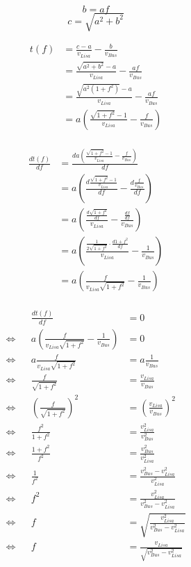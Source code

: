 \documentclass[10pt]{article}
\begin{document}
\newcommand{\comment}[1]{}

\newcommand{\vb}{v_{Bus}}
\newcommand{\vl}{v_{Lisa}}

\newcommand{\x}{x}

\renewcommand{\a}{a}
\renewcommand{\b}{b}
\renewcommand{\c}{c}

\newcommand{\f}{f}

\newcommand{\tf}{t(\f)}
\newcommand{\df}[1]{\frac{d#1}{d\f}}
\newcommand{\dtf}{\df{\tf}}

\newcommand{\abs}[1]{\lvert #1 \rvert}

\newpage

\[\b=\a\f\]
\[\c=\sqrt{\a^2+\b^2}\]

\begin{align*}
\tf &= \frac{\c-\a}{\vl} - \frac{\b}{\vb}\\
&= \frac{\sqrt{\a^2+\b^2}-\a}{\vl} - \frac{\a\f}{\vb}\\
&= \frac{\sqrt{\a^2(1+\f^2)}-\a}{\vl} - \frac{\a\f}{\vb}\\
&= \a\left(\frac{\sqrt{1+\f^2}-1}{\vl} - \frac{\f}{\vb}\right)\\
\end{align*}

\begin{align*}
\dtf &= \df{\a\left(\frac{\sqrt{1+\f^2}-1}{\vl} - \frac{\f}{\vb}\right)}\\
&= \a\left(\df{\frac{\sqrt{1+\f^2}-1}{\vl}} - \df{\frac{\f}{\vb}}\right)\\
&= \a\left(\frac{\df{\sqrt{1+\f^2}}}{\vl} - \frac{\df{\f}}{\vb}\right)\\
&= \a\left(\frac{\frac{1}{2\sqrt{1+\f^2}}\cdot\df{1+\f^2}}{\vl} - \frac{1}{\vb}\right)\\
&= \a\left(\frac{f}{\vl\sqrt{1+\f^2}} - \frac{1}{\vb}\right)\\
\end{align*}

\begin{align*}
&&\dtf &= 0\\
\iff&&\a\left(\frac{f}{\vl\sqrt{1+\f^2}} - \frac{1}{\vb}\right) &= 0\\
\iff&&\a\frac{f}{\vl\sqrt{1+\f^2}} &= \a\frac{1}{\vb}\\
\iff&&\frac{f}{\sqrt{1+\f^2}} &= \frac{\vl}{\vb}\\
\iff&&\left(\frac{f}{\sqrt{1+\f^2}}\right)^2 &= \left(\frac{\vl}{\vb}\right)^2\\
\iff&&\frac{f^2}{1+\f^2} &= \frac{\vl^2}{\vb^2}\\
\iff&&\frac{1+\f^2}{f^2} &= \frac{\vb^2}{\vl^2}\\
\iff&&\frac{1}{f^2} &= \frac{\vb^2-\vl^2}{\vl^2}\\
\iff&&f^2 &= \frac{\vl^2}{\vb^2-\vl^2}\\
\iff&&f &= \sqrt{\frac{\vl^2}{\vb^2-\vl^2}}\\
\iff&&f &= \frac{\vl}{\sqrt{\vb^2-\vl^2}}\\
\end{align*}
\end{document}
